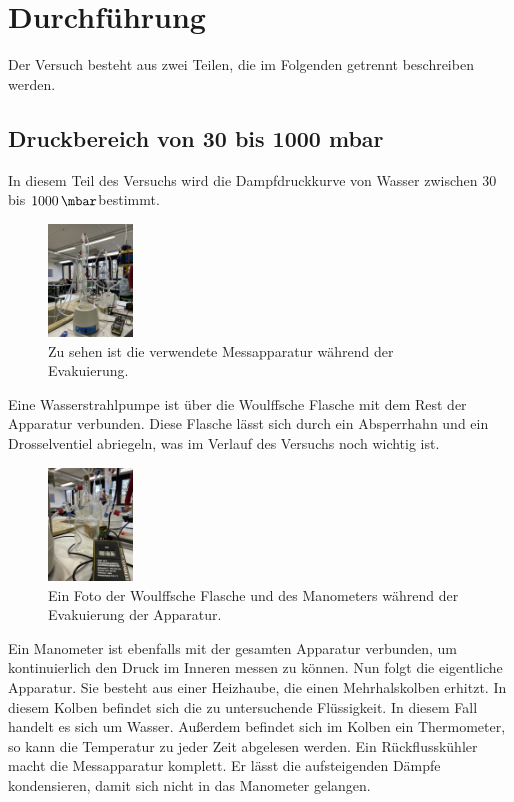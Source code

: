 \section{Durchführung}
\label{sec:Durchführung}

Der Versuch besteht aus zwei Teilen, die im Folgenden getrennt beschreiben werden.
\subsection{Druckbereich von 30 bis 1000 mbar}
In diesem Teil des Versuchs wird die Dampfdruckkurve von Wasser zwischen 30 bis $\SI{1000}{\mbar}$bestimmt.
\begin{figure}
    \centering
    \includegraphics[height=3cm, angle=270]{content/Verwendete_Messapparatur.jpeg}
    \caption{Zu sehen ist die verwendete Messapparatur während der Evakuierung.}
    \label{Abb:Messapparatur}
\end{figure}
Eine Wasserstrahlpumpe ist über die Woulffsche Flasche mit dem Rest der Apparatur verbunden.
Diese Flasche lässt sich durch ein Absperrhahn und ein Drosselventiel abriegeln, was im Verlauf des Versuchs noch wichtig ist.
\begin{figure}
    \centering
    \includegraphics[height=3cm, angle=270]{content/Woulffsche_Flasche.jpeg}
    \caption{Ein Foto der Woulffsche Flasche und des Manometers während der Evakuierung der Apparatur.}
    \label{Abb:Woulffsche_Flasche}
\end{figure}
Ein Manometer ist ebenfalls mit der gesamten Apparatur verbunden, um kontinuierlich den Druck im Inneren messen zu können.
Nun folgt die eigentliche Apparatur.
Sie besteht aus einer Heizhaube, die einen Mehrhalskolben erhitzt.
In diesem Kolben befindet sich die zu untersuchende Flüssigkeit.
In diesem Fall handelt es sich um Wasser.
Außerdem befindet sich im Kolben ein Thermometer, so kann die Temperatur zu jeder Zeit abgelesen werden.
Ein Rückflusskühler macht die Messapparatur komplett.
Er lässt die aufsteigenden Dämpfe kondensieren, damit sich nicht in das Manometer gelangen.


